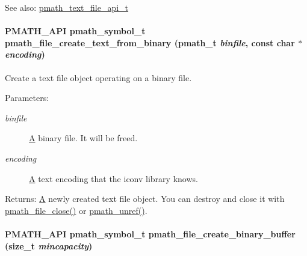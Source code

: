 \begin{Desc}
\item[See also:]\hyperlink{structpmath__text__file__api__t}{pmath\_\-text\_\-file\_\-api\_\-t} \end{Desc}
\hypertarget{group__file__api_gc6f1960c7c529c1dac9feb97cf795a1c}{
\paragraph[{pmath\_\-file\_\-create\_\-text\_\-from\_\-binary}]{\setlength{\rightskip}{0pt plus 5cm}PMATH\_\-API {\bf pmath\_\-symbol\_\-t} pmath\_\-file\_\-create\_\-text\_\-from\_\-binary ({\bf pmath\_\-t} {\em binfile}, \/  const char $\ast$ {\em encoding})}\hfill}
\label{group__file__api_gc6f1960c7c529c1dac9feb97cf795a1c}


Create a text file object operating on a binary file. 

\begin{Desc}
\item[Parameters:]
\begin{description}
\item[{\em binfile}]\hyperlink{class_a}{A} binary file. It will be freed. \item[{\em encoding}]\hyperlink{class_a}{A} text encoding that the iconv library knows. \end{description}
\end{Desc}
\begin{Desc}
\item[Returns:]\hyperlink{class_a}{A} newly created text file object. You can destroy and close it with \hyperlink{group__file__api_g61142920bd7a8f066af908092c84d8e4}{pmath\_\-file\_\-close()} or \hyperlink{classpmath__t_54e905402c38940687033b87eb8c6c9f}{pmath\_\-unref()}. \end{Desc}
\hypertarget{group__file__api_g811d829fe964ebbe554c645a0f0f519d}{
\paragraph[{pmath\_\-file\_\-create\_\-binary\_\-buffer}]{\setlength{\rightskip}{0pt plus 5cm}PMATH\_\-API {\bf pmath\_\-symbol\_\-t} pmath\_\-file\_\-create\_\-binary\_\-buffer (size\_\-t {\em mincapacity})}\hfill}
\label{group__file__api_g811d829fe964ebbe554c645a0f0f519d}


